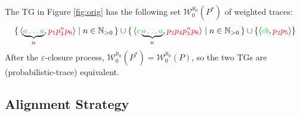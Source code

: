 \begin{example}
	The TG in Figure \ref{fig:orig} has the following set $\mathcal{W}_0^{\aleph_0}(P^*)$ of weighted traces:
$$\set{\braket{\underbrace{\color{green}a\dots a}_{n},{\color{red}p_1p_3^np_6}}|n\in \mathbb{N}_{>0}}\cup \set{\braket{{\color{green}c}\underbrace{\color{green}a\dots a}_{n},{\color{red}p_2p_4p_3^np_6}}|n\in \mathbb{N}_{>0}}\cup\{\braket{{\color{green}cb},{\color{red}p_2p_5}}\}$$
After the $\varepsilon$-closure process, $\mathcal{W}_0^{\aleph_0}(P^*)=\mathcal{W}_0^{\aleph_0}(P)$, so the two TGs are (probabilistic-trace) equivalent.
\end{example}

\subsection{Alignment Strategy}


